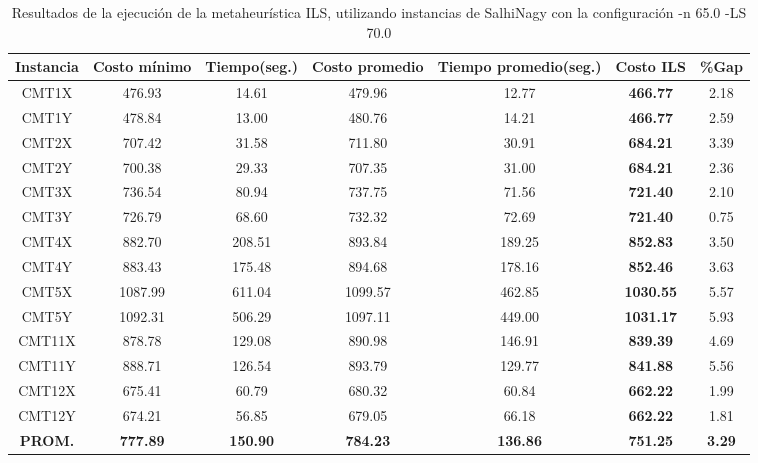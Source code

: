 \begin{table}[ht]
\caption{Resultados de la ejecución de la metaheurística ILS, utilizando instancias de SalhiNagy con la configuración -n 65.0 -LS 70.0}
\centering
\small
\begin{tabular}{c c c c c c c}
\hline\hline
Instancia & Costo mínimo & Tiempo(seg.) & Costo promedio & Tiempo promedio(seg.) & Costo ILS & \%Gap \\ [0.5ex]
\hline
CMT1X & 476.93 & 14.61 & 
479.96 & 12.77 & \bf{466.77} & 
2.18\\CMT1Y & 478.84 & 13.00 & 
480.76 & 14.21 & \bf{466.77} & 
2.59\\CMT2X & 707.42 & 31.58 & 
711.80 & 30.91 & \bf{684.21} & 
3.39\\CMT2Y & 700.38 & 29.33 & 
707.35 & 31.00 & \bf{684.21} & 
2.36\\CMT3X & 736.54 & 80.94 & 
737.75 & 71.56 & \bf{721.40} & 
2.10\\CMT3Y & 726.79 & 68.60 & 
732.32 & 72.69 & \bf{721.40} & 
0.75\\CMT4X & 882.70 & 208.51 & 
893.84 & 189.25 & \bf{852.83} & 
3.50\\CMT4Y & 883.43 & 175.48 & 
894.68 & 178.16 & \bf{852.46} & 
3.63\\CMT5X & 1087.99 & 611.04 & 
1099.57 & 462.85 & \bf{1030.55} & 
5.57\\CMT5Y & 1092.31 & 506.29 & 
1097.11 & 449.00 & \bf{1031.17} & 
5.93\\CMT11X & 878.78 & 129.08 & 
890.98 & 146.91 & \bf{839.39} & 
4.69\\CMT11Y & 888.71 & 126.54 & 
893.79 & 129.77 & \bf{841.88} & 
5.56\\CMT12X & 675.41 & 60.79 & 
680.32 & 60.84 & \bf{662.22} & 
1.99\\CMT12Y & 674.21 & 56.85 & 
679.05 & 66.18 & \bf{662.22} & 
1.81\\\bf{PROM.} & 
\bf{777.89} & \bf{150.90} & \bf{784.23} & \bf{136.86} & \bf{751.25} & \bf{3.29}\\[1ex]\hline
\end{tabular}
\label{table:nonlin}
\end{table} \clearpage
